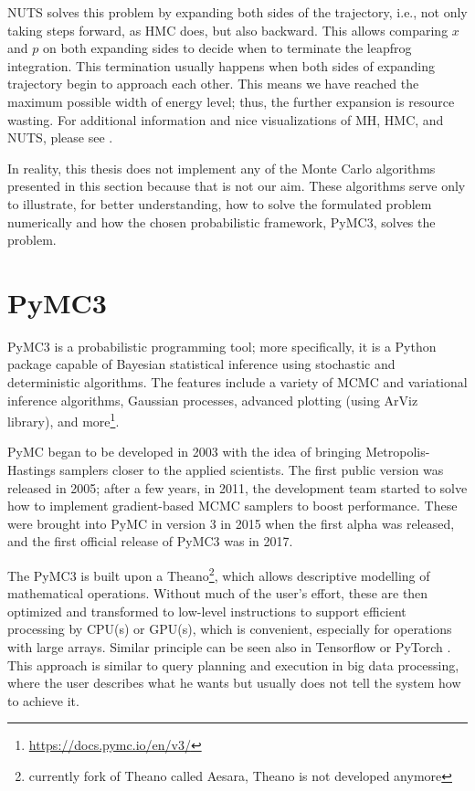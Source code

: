 \documentclass[
  digital, %
  oneside, %
  lof,     %
  lot,     %
]{fithesis4}
\begin{document}
NUTS solves this problem by expanding both sides of the trajectory, i.e., not only taking steps forward, as HMC does, but also backward.
This allows comparing $x$ and $p$ on both expanding sides to decide when to terminate the leapfrog integration.
This termination usually happens when both sides of expanding trajectory begin to approach each other.
This means we have reached the maximum possible width of energy level; thus, the further expansion is resource wasting.
For additional information and nice visualizations of MH, HMC, and NUTS, please see \cite{mcelreath2017}.

In reality, this thesis does not implement any of the Monte Carlo algorithms presented in this section because that is not our aim.
These algorithms serve only to illustrate, for better understanding, how to solve the formulated problem numerically and how the chosen probabilistic framework, PyMC3, solves the problem.


\section{PyMC3}\label{sec:pymc3}

PyMC3 is a probabilistic programming tool; more specifically, it is a Python package capable of Bayesian statistical inference using stochastic and deterministic algorithms. 
The features include a variety of MCMC and variational inference algorithms, Gaussian processes, advanced plotting (using ArViz library), and more\footnote{\url{https://docs.pymc.io/en/v3/}}.

PyMC began to be developed in 2003 with the idea of bringing Metropolis-Hastings samplers closer to the applied scientists.
The first public version was released in 2005; after a few years, in 2011, the development team started to solve how to implement gradient-based MCMC samplers to boost performance.
These were brought into PyMC in version 3 in 2015 when the first alpha was released, and the first official release of PyMC3 was in 2017.

The PyMC3 is built upon a Theano\footnote{currently fork of Theano called Aesara, Theano is not developed anymore}, which allows descriptive modelling of mathematical operations.
Without much of the user's effort, these are then optimized and transformed to low-level instructions to support efficient processing by CPU(s) or GPU(s), which is convenient, especially for operations with large arrays.
Similar principle can be seen also in Tensorflow \cite{tf} or PyTorch \cite{pytorch}.
This approach is similar to query planning and execution in big data processing, where the user describes what he wants but usually does not tell the system how to achieve it.
\end{document}
